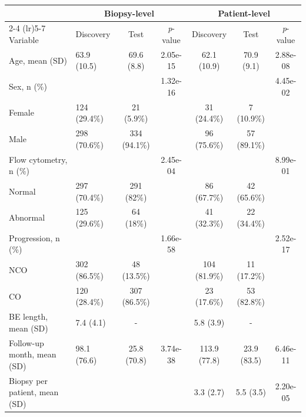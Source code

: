 \documentclass{article}
\begin{document}
\begin{table}[htbp]
\centering
\begin{tabular}{@{}llccccc@{}}
\toprule
& \multicolumn{3}{c}{Biopsy-level} & \multicolumn{3}{c}{Patient-level} \\
\cmidrule(lr){2-4} \cmidrule(lr){5-7}
Variable & Discovery & Test & \textit{p}-value & Discovery & Test & \textit{p}-value \\
\midrule
Age, mean (SD) & 63.9 (10.5) & 69.6 (8.8) & 2.05e-15 & 62.1 (10.9) & 70.9 (9.1) & 2.88e-08 \\
\addlinespace
Sex, n (\%) & & & 1.32e-16 & & &4.45e-02 \\
\qquad Female & 124 (29.4\%)   & 21 (5.9\%) & &31 (24.4\%) &7 (10.9\%)  & \\
\qquad Male & 298 (70.6\%) &334 (94.1\%) &  & 96 (75.6\%) & 57 (89.1\%) & \\
\addlinespace
Flow cytometry, n (\%) & & &2.45e-04& & &8.99e-01 \\
\qquad Normal & 297 (70.4\%)&291 (82\%) & & 86 (67.7\%) & 42 (65.6\%) & \\
\qquad Abnormal & 125 (29.6\%) &64 (18\%) &  & 41 (32.3\%) & 22 (34.4\%) & \\
\addlinespace
Progression, n (\%) & & & 1.66e-58 & & &2.52e-17\\
\qquad NCO & 302 (86.5\%) & 48 (13.5\%) & & 104 (81.9\%) & 11 (17.2\%) & \\
\qquad CO & 120 (28.4\%) & 307 (86.5\%) & &  23 (17.6\%) & 53 (82.8\%) & \\
\addlinespace
BE length, mean (SD) & 7.4 (4.1) & -& &     5.8 (3.9) & -  & \\
\addlinespace
Follow-up month, mean (SD) & 98.1 (76.6) & 25.8 (70.8) & 3.74e-38 & 113.9 (77.8) & 23.9 (83.5) & 6.46e-11\\
\addlinespace
Biopsy per patient, mean (SD) & & & & 3.3 (2.7) & 5.5 (3.5)  &2.20e-05 \\
\bottomrule
\end{tabular}
\end{table}
\end{document}
